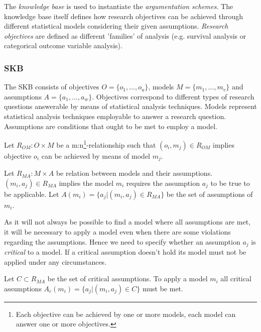 The \textit{knowledge base} is used to instantiate the \textit{argumentation schemes}. The knowledge base itself defines how research objectives can be achieved through different statistical models considering their given assumptions. \textit{Research objectives} are defined as different 'families' of analysis (e.g. survival analysis or categorical outcome variable analysis).



\subsubsection*{\Gls{SKB}}


The \gls{SKB} consists of objectives $O=\{o_1, ..., o_u\}$, models $M=\{m_1, ..., m_v\}$ and assumptions $A = \{a_1, ..., a_w\}$. Objectives correspond to different types of research questions answerable by means of statistical analysis techniques. Models represent statistical analysis techniques employable to answer a research question. Assumptions are conditions that ought to be met to employ a model.
\begin{definition}
	Let $R_{OM}: O \times M$ be a m:n\footnote{Each objective can be achieved by one or more models, each model can answer one or more objectives.}-relationship such that $(o_i, m_j)\in R_{OM}$ implies objective $o_i$ can be achieved by means of model $m_j$. 
\end{definition}

\begin{definition}
	Let $R_{MA}: M \times A$ be relation between models and their assumptions. $(m_i, a_j)\in R_{MA}$ implies  the model $m_i$ requires the assumption $a_j$ to be true to be applicable. Let $A(m_i) = \{a_j | (m_i, a_j) \in R_{MA}\}$ be the set of assumptions of $m_i$.
\end{definition}

As it will not always be possible to find a model where all assumptions are met, it will be necessary to apply a model even when there are some violations regarding the assumptions. Hence we need to specify whether an assumption $a_j$ is \textit{critical} to a model. If a critical assumption doesn't hold its model must not be applied under any circumstances.

\begin{definition}
Let $C \subset R_{MA}$ be the set of critical assumptions. To apply a model $m_i$ all critical assumptions $A_c(m_i) = \{a_j | (m_i, a_j) \in C\}$ must be met.
\end{definition}

